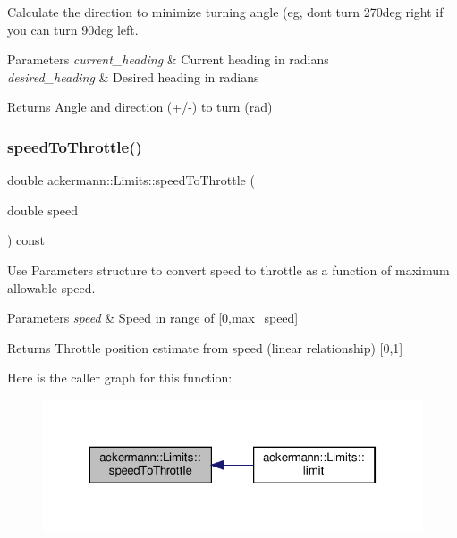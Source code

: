 Calculate the direction to minimize turning angle (eg, don\textquotesingle{}t turn 270deg right if you can turn 90deg left. 


\begin{DoxyParams}{Parameters}
{\em current\+\_\+heading} & Current heading in radians \\
\hline
{\em desired\+\_\+heading} & Desired heading in radians \\
\hline
\end{DoxyParams}
\begin{DoxyReturn}{Returns}
Angle and direction (+/-\/) to turn (rad) 
\end{DoxyReturn}
\mbox{\label{classackermann_1_1_limits_abb347d9d57d22dfe47ef704ea6d10d7d}} 
\subsubsection{\texorpdfstring{speed\+To\+Throttle()}{speedToThrottle()}}
{\footnotesize\ttfamily double ackermann\+::\+Limits\+::speed\+To\+Throttle (\begin{DoxyParamCaption}\item[{double}]{speed }\end{DoxyParamCaption}) const}



Use Parameters structure to convert speed to throttle as a function of maximum allowable speed. 


\begin{DoxyParams}{Parameters}
{\em speed} & Speed in range of \mbox{[}0,max\+\_\+speed\mbox{]} \\
\hline
\end{DoxyParams}
\begin{DoxyReturn}{Returns}
Throttle position estimate from speed (linear relationship) \mbox{[}0,1\mbox{]} 
\end{DoxyReturn}
Here is the caller graph for this function\+:
\nopagebreak
\begin{figure}[H]
\begin{center}
\leavevmode
\includegraphics[width=322pt]{classackermann_1_1_limits_abb347d9d57d22dfe47ef704ea6d10d7d_icgraph}
\end{center}
\end{figure}
\mbox{\label{classackermann_1_1_limits_a0e75c61fc7d5d90c6f64af78d8cf76ff}} 
